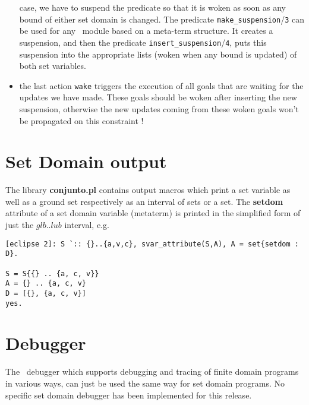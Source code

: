 \begin{itemize}
case, we have to suspend the predicate so that it is woken as soon as
any bound of either set domain is changed. The predicate
\verb/make_suspension//\verb/3/ can be used for any \eclipse\ module
based on a meta-term structure. It creates a suspension, and then the
predicate \verb/insert_suspension//\verb/4/, puts this suspension into
the appropriate lists (woken when any bound is updated) of both set
variables.
\item the last action \verb/wake/ triggers the execution of all goals that are
waiting for the updates we have made. These goals should be woken
after inserting the new suspension, otherwise the new updates coming
from these woken goals won't be propagated on this constraint !
\end{itemize}
\section{Set Domain output}

The library {\bf conjunto.pl} contains output macros which print a set
variable as well as a ground set respectively as an interval of sets or
a set. The {\bf setdom} attribute of a set domain variable (metaterm)
is printed in the simplified form of just the $glb..lub$ interval, e.g.

\begin{verbatim}
[eclipse 2]: S `:: {}..{a,v,c}, svar_attribute(S,A), A = set{setdom : D}.

S = S{{} .. {a, c, v}}
A = {} .. {a, c, v}
D = [{}, {a, c, v}]
yes.
\end{verbatim}

\section{Debugger}

The \eclipse\ debugger which supports debugging and tracing of finite
domain programs in various ways, can just be used the same way for set
domain programs. No specific set domain debugger has been implemented
for this release. 

\begin{latexonly}
\disableunderscores
\end{latexonly}

